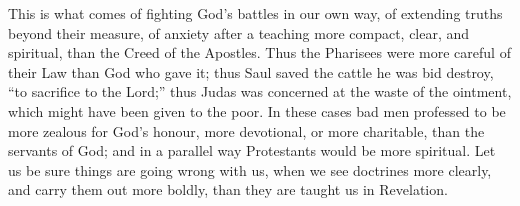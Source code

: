 This is what comes of fighting God's battles in our own way, of
extending truths beyond their measure, of anxiety after a teaching
more compact, clear, and spiritual, than the Creed of the Apostles.
Thus the Pharisees were more careful of their Law than God who gave
it; thus Saul saved the cattle he was bid destroy, ``to sacrifice
to the Lord;'' thus Judas was concerned at the waste of the
ointment, which might have been given to the poor. In these cases bad
men professed to be more zealous for God's honour, more
devotional, or more charitable, than the servants of God; and in a
parallel way Protestants would be more spiritual. Let us be sure
things are going wrong with us, when we see doctrines more clearly,
and carry them out more boldly, than they are taught us in Revelation.


